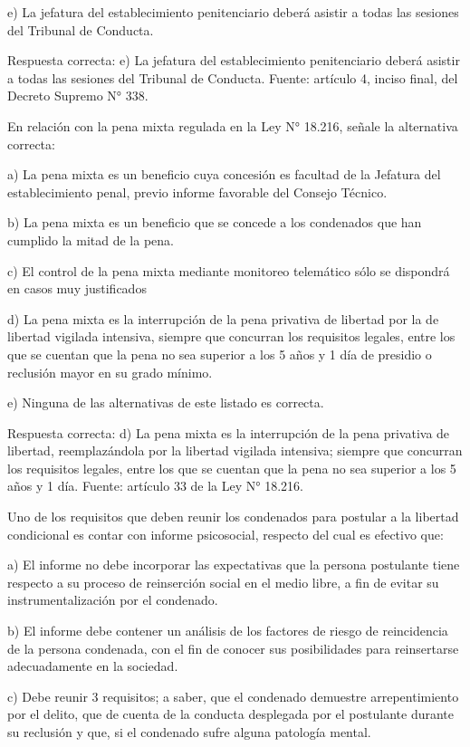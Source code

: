 \documentclass[letterpaper, 11pt]{article}
\begin{document}
e) La jefatura del establecimiento penitenciario deberá asistir a todas las sesiones del
Tribunal de Conducta.

Respuesta correcta:
e) La jefatura del establecimiento penitenciario deberá asistir a todas
las sesiones del Tribunal de Conducta.
Fuente: artículo 4, inciso final, del Decreto Supremo N° 338.

En relación con la pena mixta regulada en la Ley N° 18.216, señale la alternativa
correcta:

a) La pena mixta es un beneficio cuya concesión es facultad de la Jefatura del
establecimiento penal, previo informe favorable del Consejo Técnico.

b) La pena mixta es un beneficio que se concede a los condenados que han cumplido la
mitad de la pena.

c) El control de la pena mixta mediante monitoreo telemático sólo se dispondrá en casos
muy justificados

d) La pena mixta es la interrupción de la pena privativa de libertad por la de libertad vigilada
intensiva, siempre que concurran los requisitos legales, entre los que se cuentan que la
pena no sea superior a los 5 años y 1 día de presidio o reclusión mayor en su grado mínimo.

e) Ninguna de las alternativas de este listado es correcta.

Respuesta correcta: d) La pena mixta es la interrupción de la pena privativa de libertad,
reemplazándola por la libertad vigilada intensiva; siempre que concurran los requisitos
legales, entre los que se cuentan que la pena no sea superior a los 5 años y 1 día.
Fuente: artículo 33 de la Ley N° 18.216.

Uno de los requisitos que deben reunir los condenados para postular a la libertad
condicional es contar con informe psicosocial, respecto del cual es efectivo que:

a) El informe no debe incorporar las expectativas que la persona postulante tiene respecto
a su proceso de reinserción social en el medio libre, a fin de evitar su instrumentalización
por el condenado.

b) El informe debe contener un análisis de los factores de riesgo de reincidencia de la
persona condenada, con el fin de conocer sus posibilidades para reinsertarse
adecuadamente en la sociedad.

c) Debe reunir 3 requisitos; a saber, que el condenado demuestre arrepentimiento por el
delito, que de cuenta de la conducta desplegada por el postulante durante su reclusión y
que, si el condenado sufre alguna patología mental.
\end{document}
